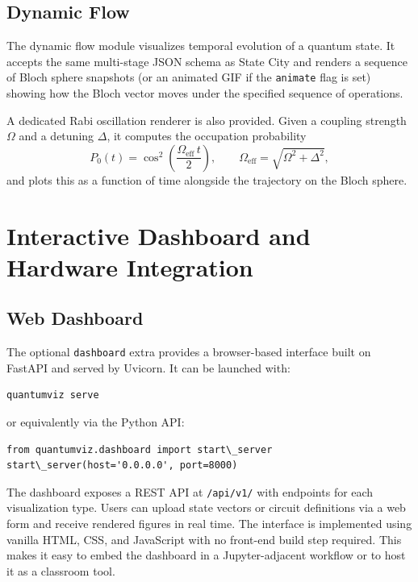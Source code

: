 \documentclass{SciPost}
\begin{document}
\subsection{Dynamic Flow}

The dynamic flow module visualizes temporal evolution of a quantum state.
It accepts the same multi-stage JSON schema as State City and renders a
sequence of Bloch sphere snapshots (or an animated GIF if the
\texttt{animate} flag is set) showing how the Bloch vector moves under the
specified sequence of operations.

A dedicated Rabi oscillation renderer is also provided.
Given a coupling strength $\Omega$ and a detuning $\Delta$, it computes the
occupation probability
\begin{equation}
  P_0(t) = \cos^2\!\left(\frac{\Omega_\mathrm{eff}\, t}{2}\right),
  \qquad
  \Omega_\mathrm{eff} = \sqrt{\Omega^2 + \Delta^2},
  \label{eq:rabi}
\end{equation}
and plots this as a function of time alongside the trajectory on the Bloch
sphere.

\section{Interactive Dashboard and Hardware Integration}
\label{sec:dashboard}

\subsection{Web Dashboard}

The optional \texttt{dashboard} extra provides a browser-based interface built
on FastAPI and served by Uvicorn.
It can be launched with:
\begin{lstlisting}
quantumviz serve
\end{lstlisting}
or equivalently via the Python API:
\begin{lstlisting}
from quantumviz.dashboard import start\_server
start\_server(host='0.0.0.0', port=8000)
\end{lstlisting}

The dashboard exposes a REST API at \texttt{/api/v1/} with endpoints for each
visualization type.
Users can upload state vectors or circuit definitions via a web form and
receive rendered figures in real time.
The interface is implemented using vanilla HTML, CSS, and JavaScript with no
front-end build step required.
This makes it easy to embed the dashboard in a Jupyter-adjacent workflow or to
host it as a classroom tool.
\end{document}
